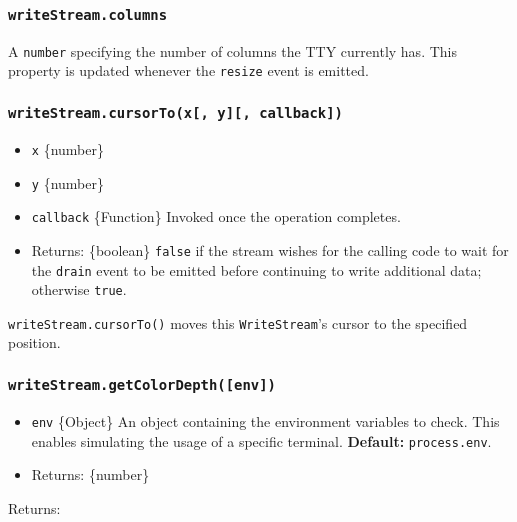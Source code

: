 \subsubsection{\texorpdfstring{\texttt{writeStream.columns}}{writeStream.columns}}\label{writestream.columns}

A \texttt{number} specifying the number of columns the TTY currently
has. This property is updated whenever the
\texttt{\textquotesingle{}resize\textquotesingle{}} event is emitted.

\subsubsection{\texorpdfstring{\texttt{writeStream.cursorTo(x{[},\ y{]}{[},\ callback{]})}}{writeStream.cursorTo(x{[}, y{]}{[}, callback{]})}}\label{writestream.cursortox-y-callback}

\begin{itemize}
\tightlist
\item
  \texttt{x} \{number\}
\item
  \texttt{y} \{number\}
\item
  \texttt{callback} \{Function\} Invoked once the operation completes.
\item
  Returns: \{boolean\} \texttt{false} if the stream wishes for the
  calling code to wait for the
  \texttt{\textquotesingle{}drain\textquotesingle{}} event to be emitted
  before continuing to write additional data; otherwise \texttt{true}.
\end{itemize}

\texttt{writeStream.cursorTo()} moves this \texttt{WriteStream}'s cursor
to the specified position.

\subsubsection{\texorpdfstring{\texttt{writeStream.getColorDepth({[}env{]})}}{writeStream.getColorDepth({[}env{]})}}\label{writestream.getcolordepthenv}

\begin{itemize}
\tightlist
\item
  \texttt{env} \{Object\} An object containing the environment variables
  to check. This enables simulating the usage of a specific terminal.
  \textbf{Default:} \texttt{process.env}.
\item
  Returns: \{number\}
\end{itemize}

Returns:

